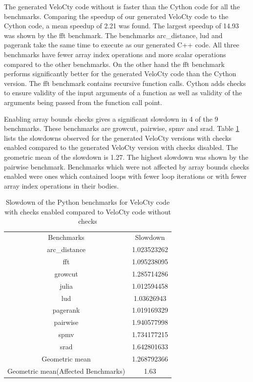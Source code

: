 The generated VeloCty code without is faster than the Cython code for all the benchmarks. Comparing the speedup of our generated VeloCty code to the Cython code, a mean speedup of 2.21 was found. The largest speedup of 14.93 was shown by the fft benchmark. The benchmarks arc\_distance, lud and pagerank take the same time to execute as our generated C++ code. All three benchmarks have fewer array index operations and more scalar operations compared to the other benchmarks. On the other hand the fft benchmark performs significantly better for the generated VeloCty code than the Cython version. The fft benchmark contains recursive function calls. Cython adds checks to ensure validity of the input arguments of a function as well as validity of the arguments being passed from the function call point. 

Enabling array bounds checks gives a significant slowdown in 4 of the 9 benchmarks. These benchmarks are growcut, pairwise, spmv and srad. Table \ref{tab:cwvscwopy} lists the slowdowns observed for the generated VeloCty versions with checks enabled compared to the generated VeloCty version with checks disabled. The geometric mean of the slowdown is 1.27. The highest slowdown was shown by the pairwise benchmark. Benchmarks which were not affected by array bounds checks enabled were ones which contained loops with fewer loop iterations or with fewer array index operations in their bodies. 
\begin{table}[htbp]
\centering
\begin{tabular}{|c|c|}
\hline
Benchmarks     & Slowdown    \\ \hhline{|=|=|}
arc\_distance  & 1.023523262 \\ \hline
fft            & 1.095238095 \\ \hline
growcut        & 1.285714286 \\ \hline
julia          & 1.012594458 \\ \hline
lud            & 1.03626943  \\ \hline
pagerank       & 1.019169329 \\ \hline
pairwise       & 1.940577998 \\ \hline
spmv           & 1.734177215 \\ \hline
srad           & 1.642801633 \\ \hline
Geometric mean & 1.268792366 \\ \hline
Geometric mean(Affected Benchmarks)  &  1.63 \\ \hline
\end{tabular}
\caption{Slowdown of the Python benchmarks for VeloCty code with checks enabled compared to VeloCty code without checks}
\label{tab:cwvscwopy}
\end{table}

